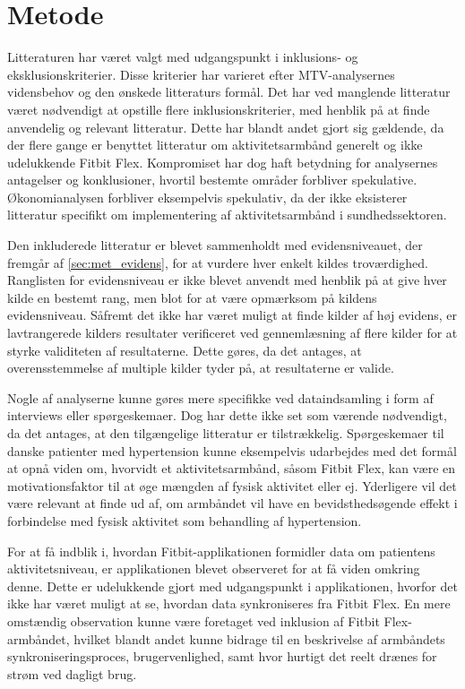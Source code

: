 \section{Metode}
Litteraturen har været valgt med udgangspunkt i inklusions- og eksklusionskriterier. Disse kriterier har varieret efter MTV-analysernes vidensbehov og den ønskede litteraturs formål. Det har ved manglende litteratur været nødvendigt at opstille flere inklusionskriterier, med henblik på at finde anvendelig og relevant litteratur. Dette har blandt andet gjort sig gældende, da der flere gange er benyttet litteratur om aktivitetsarmbånd generelt og ikke udelukkende Fitbit Flex. Kompromiset har dog haft betydning for analysernes antagelser og konklusioner, hvortil bestemte områder forbliver spekulative. Økonomianalysen forbliver eksempelvis spekulativ, da der ikke eksisterer litteratur specifikt om implementering af aktivitetsarmbånd i sundhedssektoren. 

Den inkluderede litteratur er blevet sammenholdt med evidensniveauet, der fremgår af \autoref{sec:met_evidens}, for at vurdere hver enkelt kildes troværdighed. Ranglisten for evidensniveau er ikke blevet anvendt med henblik på at give hver kilde en bestemt rang, men blot for at være opmærksom på kildens evidensniveau. Såfremt det ikke har været muligt at finde kilder af høj evidens, er lavtrangerede kilders resultater verificeret ved gennemlæsning af flere kilder for at styrke validiteten af resultaterne.  Dette gøres, da det antages, at overensstemmelse af multiple kilder tyder på, at resultaterne er valide. 

Nogle af analyserne kunne gøres mere specifikke ved dataindsamling i form af interviews eller spørgeskemaer. Dog har dette ikke set som værende nødvendigt, da det antages, at den tilgængelige litteratur er tilstrækkelig. Spørgeskemaer til danske patienter med hypertension kunne eksempelvis udarbejdes med det formål at opnå viden om, hvorvidt et aktivitetsarmbånd, såsom Fitbit Flex, kan være en motivationsfaktor til at øge mængden af fysisk aktivitet eller ej. Yderligere vil det være relevant at finde ud af, om armbåndet vil have en bevidsthedsøgende effekt i forbindelse med fysisk aktivitet som behandling af hypertension. 

For at få indblik i, hvordan Fitbit-applikationen formidler data om patientens aktivitetsniveau, er applikationen blevet observeret for at få viden omkring denne. Dette er udelukkende gjort med udgangspunkt i applikationen, hvorfor det ikke  har været muligt at se, hvordan data synkroniseres fra Fitbit Flex. En mere omstændig observation kunne være foretaget ved inklusion af Fitbit Flex-armbåndet, hvilket blandt andet kunne bidrage til en beskrivelse af armbåndets synkroniseringsproces, brugervenlighed, samt hvor hurtigt det reelt drænes for strøm ved dagligt brug.  